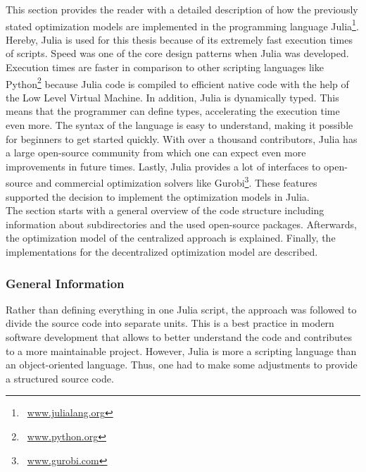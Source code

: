 This section provides the reader with a detailed description of how the previously stated optimization models are implemented in the programming language Julia\footnote{~\url{www.julialang.org}}. Hereby, Julia is used for this thesis because of its extremely fast execution times of scripts. Speed was one of the core design patterns when Julia was developed. Execution times are faster in comparison to other scripting languages like Python\footnote{~\url{www.python.org}} because Julia code is compiled to efficient native code with the help of the Low Level Virtual Machine. In addition, Julia is dynamically typed. This means that the programmer can define types, accelerating the execution time even more. The syntax of the language is easy to understand, making it possible for beginners to get started quickly. With over a thousand contributors, Julia has a large open-source community from which one can expect even more improvements in future times. Lastly, Julia provides a lot of interfaces to open-source and commercial optimization solvers like Gurobi\footnote{~\url{www.gurobi.com}}. These features supported the decision to implement the optimization models in Julia. \\

The section starts with a general overview of the code structure including information about subdirectories and the used open-source packages. Afterwards, the optimization model of the centralized approach is explained. Finally, the implementations for the decentralized optimization model are described.

\subsubsection{General Information}

Rather than defining everything in one Julia script, the approach was followed to divide the source code into separate units. This is a best practice in modern software development that allows to better understand the code and contributes to a more maintainable project. However, Julia is more a scripting language than an object-oriented language. Thus, one had to make some adjustments to provide a structured source code.\\ 

